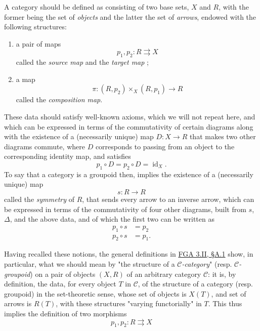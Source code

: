   A category should be defined as consisting of two base sets, \(X\) and \(R\), with the former being the set of \emph{objects} and the latter the set of \emph{arrows}, endowed with the following structures:

  
 \begin{enumerate}
    
 \item[i.]
      a pair of maps
      \[         p_1,p_2\colon  R\rightrightarrows  X       \]
      called the \emph{source map} and the \emph{target map} ;
    

    
 \item[ii.]
      a map
      \[         \pi \colon (R,p_2)\times _X(R,p_1) \to  R       \]
      called the \emph{composition map}.
    

  \end{enumerate}


  These data should satisfy well-known axioms, which we will not repeat here, and which can be expressed in terms of the commutativity of certain diagrams along with the existence of a (necessarily unique) map \(D\colon  X\to  R\) that makes two other diagrams commute, where \(D\) corresponds to passing from an object to the corresponding identity map, and satisfies
  \[     p_1\circ  D = p_2\circ  D = \operatorname {id}_X.   \]
  To say that a category is a groupoid then, implies the existence of a (necessarily unique) map
  \[     s\colon  R\to  R   \]
  called the \emph{symmetry} of \(R\), that sends every arrow to an inverse arrow, which can be expressed in terms of the commutativity of four other diagrams, built from \(s\), \(\Delta \), and the above data, and of which the first two can be written as
  \[     \begin {aligned}       p_1\circ  s &= p_2     \\p_2\circ  s &= p_1.     \end {aligned}   \]\par{}Having recalled these notions, the general definitions in \hyperref[fga3.ii-a.1]{FGA 3.II, §A.1} show, in particular, what we should mean by "the structure of a \emph{\(\mathcal {C}\)-category}" (resp. \emph{\(\mathcal {C}\)-groupoid}) on a pair of objects \((X,R)\) of an arbitrary category \(\mathcal {C}\):
  it is, by definition, the data, for every object \(T\) in \(\mathcal {C}\), of the structure of a category (resp. groupoid) in the set-theoretic sense, whose set of objects is \(X(T)\), and set of arrows is \(R(T)\), with these structures "varying functorially" in \(T\).
  This thus implies the definition of two morphisms
  \[     p_1,p_2\colon  R\rightrightarrows  X   \]
  
